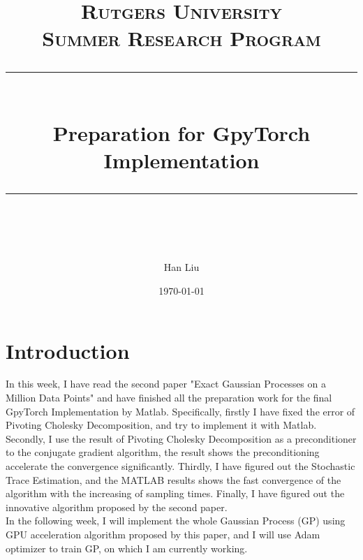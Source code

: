 \documentclass{article} %
\title{
\normalfont \normalsize 
\textsc{Rutgers University \\ 
Summer Research Program} \\
[10pt] 
\rule{\linewidth}{0.5pt} \\[6pt] 
\huge Preparation for GpyTorch Implementation  \\
\rule{\linewidth}{2pt}  \\[10pt]
}
\author{Han Liu}
\date{\normalsize \today}
\begin{document}
\maketitle



\section{Introduction}
In this week, I have read the second paper "Exact Gaussian Processes on a Million Data Points" and have finished all the preparation work for the final GpyTorch Implementation by Matlab. Specifically, firstly I have fixed the error of Pivoting Cholesky Decomposition, and try to implement it with Matlab. Secondly, I use the result of Pivoting Cholesky Decomposition as a preconditioner to the conjugate gradient algorithm, the result shows the preconditioning accelerate the convergence significantly. Thirdly, I have figured out the Stochastic Trace Estimation, and the MATLAB results shows the fast convergence of the algorithm with the increasing of sampling times. Finally, I have figured out the innovative algorithm proposed by the second paper.\\

\noindent In the following week, I will implement the whole Gaussian Process (GP) using GPU acceleration algorithm proposed by this paper, and I will use Adam optimizer to train GP, on which I am currently working.
\end{document}
